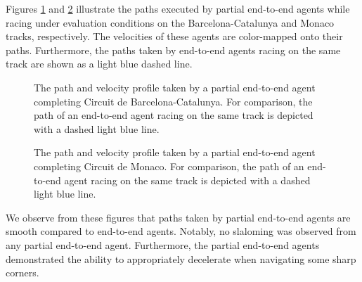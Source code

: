 Figures \ref{fig:esp_eval} and \ref{fig:mco_eval} illustrate the paths executed by partial end-to-end agents while racing under evaluation conditions on the Barcelona-Catalunya and Monaco tracks, respectively.
The velocities of these agents are color-mapped onto their paths.
Furthermore, the paths taken by end-to-end agents racing on the same track are shown as a light blue dashed line.
\begin{figure}[b]
    \centering
    
    \caption[The path and velocity profile taken by a partial end-to-end agent completing Circuit de Barcelona-Catalunya]{The path and velocity profile taken by a partial end-to-end agent completing Circuit de Barcelona-Catalunya. For comparison, the path of an end-to-end agent racing on the same track is depicted with a dashed light blue line.}
    \label{fig:esp_eval}
\end{figure}
\begin{figure}[t]
    \centering
    
    \caption[The path and velocity profile taken by a partial end-to-end agent completing Circuit de Monaco]{The path and velocity profile taken by a partial end-to-end agent completing Circuit de Monaco. For comparison, the path of an end-to-end agent racing on the same track is depicted with a dashed light blue line.}
    \label{fig:mco_eval}
\end{figure}
We observe from these figures that paths taken by partial end-to-end agents are smooth compared to end-to-end agents.
Notably, no slaloming was observed from any partial end-to-end agent.
Furthermore, the partial end-to-end agents demonstrated the ability to appropriately decelerate when navigating some sharp corners.

%     

%     



